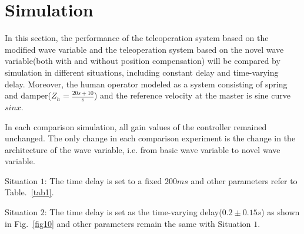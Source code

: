 \section{Simulation}
In this section,
the performance of the teleoperation system based on the modified wave variable
and the teleoperation system based on the novel wave variable(both with and without position compensation)
will be compared by simulation in different situations,
including constant delay and time-varying delay.
Moreover,
the human operator modeled as a system consisting of spring and damper($Z_h=\frac{20s+10}{s}$)
and the reference velocity at the master is sine curve $sinx$.
\par In each comparison simulation,
all gain values of the controller remained unchanged.
The only change in each comparison experiment is the change in the architecture of the wave variable,
i.e. from basic wave variable to novel wave variable.
\par Situation $1$: The time delay is set to a fixed $200ms$
and other parameters refer to Table.~\ref{tab1}.

\par Situation $2$: The time delay is set as the time-varying delay($0.2\pm 0.15s$)
as shown in Fig.~\ref{fig10}
and other parameters remain the same with Situation $1$.


